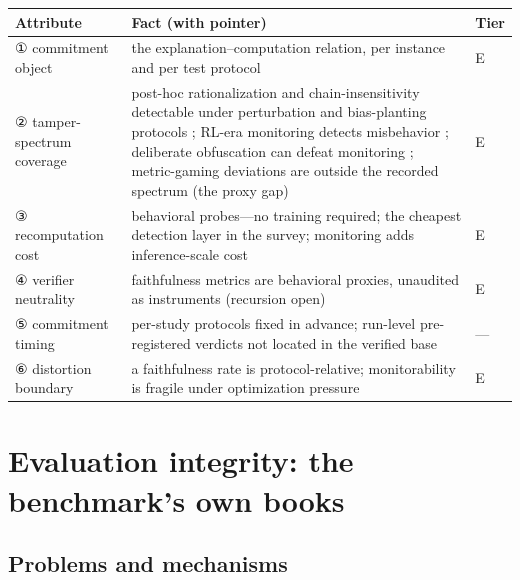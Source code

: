 \documentclass[11pt,a4paper]{article}
\begin{document}
\begin{table}[htbp]
\centering
\footnotesize
\setlength{\tabcolsep}{3.5pt}
\renewcommand{\arraystretch}{1.18}
\begin{tabularx}{0.985\textwidth}{>{\raggedright\arraybackslash}p{} >{\raggedright\arraybackslash}X >{\raggedright\arraybackslash}p{}}
\toprule
\textbf{Attribute} & \textbf{Fact (with pointer)} & \textbf{Tier} \\
\midrule
① commitment object & the explanation–computation relation, per instance and per test protocol \cite{key02,key03} & E \\
② tamper-spectrum coverage & post-hoc rationalization and chain-insensitivity detectable under perturbation and bias-planting protocols \cite{key02,key03}; RL-era monitoring detects misbehavior \cite{key27,key28}; deliberate obfuscation can defeat monitoring \cite{key30}; metric-gaming deviations are outside the recorded spectrum (the proxy gap) & E \\
③ recomputation cost & behavioral probes—no training required; the cheapest detection layer in the survey; monitoring adds inference-scale cost \cite{key27} & E \\
④ verifier neutrality & faithfulness metrics are behavioral proxies, unaudited as instruments (recursion open) \cite{key02,key03} & E \\
⑤ commitment timing & per-study protocols fixed in advance; run-level pre-registered verdicts not located in the verified base & — \\
⑥ distortion boundary & a faithfulness rate is protocol-relative; monitorability is fragile under optimization pressure \cite{key27,key29,key30} & E \\
\bottomrule
\end{tabularx}
\end{table}

\section{Evaluation integrity: the benchmark's own books}

\subsection{Problems and mechanisms}
\end{document}
